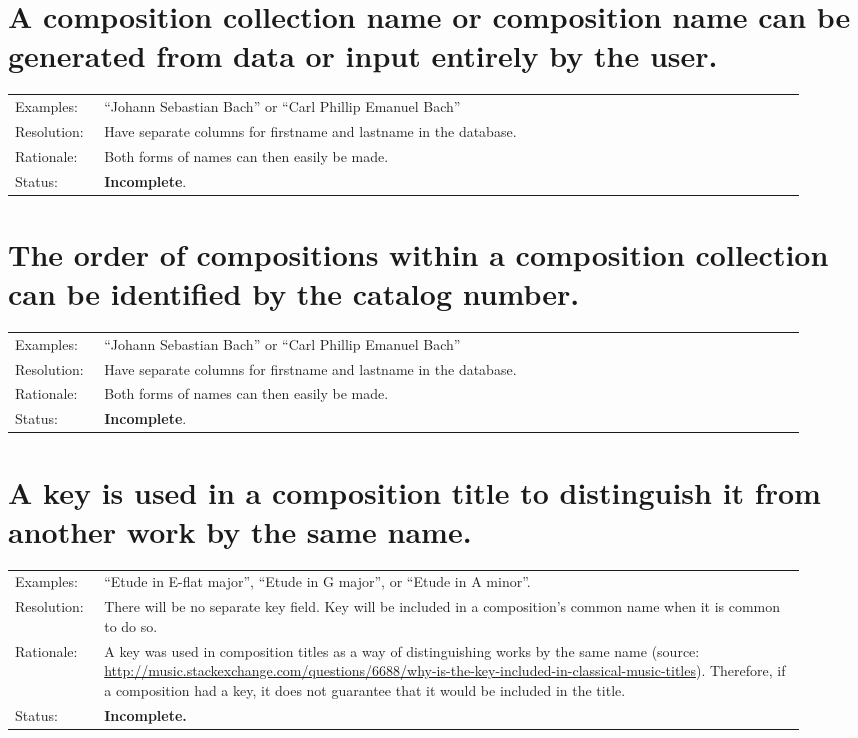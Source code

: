 \documentclass[letterpaper]{report}
\begin{document}
\section{A composition collection name or composition name can be generated from data or input entirely by the user.}
\label{D.12}

\begin{tabular}{ p{0.1\linewidth} p{0.825\linewidth} }
  Examples: & ``Johann Sebastian Bach'' or ``Carl Phillip Emanuel Bach'' \\ 
  Resolution: & Have separate columns for firstname and lastname in the database. \\
  Rationale: & Both forms of names can then easily be made. \\
  Status: & \textbf{Incomplete}.
\end{tabular}

\section{The order of compositions within a composition collection can be identified by the catalog number.}
\label{D.12}

\begin{tabular}{ p{0.1\linewidth} p{0.825\linewidth} }
  Examples: & ``Johann Sebastian Bach'' or ``Carl Phillip Emanuel Bach'' \\ 
  Resolution: & Have separate columns for firstname and lastname in the database. \\
  Rationale: & Both forms of names can then easily be made. \\
  Status: & \textbf{Incomplete}.
\end{tabular}

\section{A key is used in a composition title to distinguish it from another work by the same name.}

\begin{tabular}{ p{0.1\linewidth} p{0.825\linewidth} }
  Examples: & ``Etude in E-flat major'', ``Etude in G major'', or ``Etude in A minor''. \\ 
  Resolution: & There will be no separate key field. Key will be included in a composition's common name when it is common to do so. \\
  Rationale: & A key was used in composition titles as a way of distinguishing works by the same name (source: \url{http://music.stackexchange.com/questions/6688/why-is-the-key-included-in-classical-music-titles}). Therefore, if a composition had a key, it does not guarantee that it would be included in the title. \\
  Status: & \textbf{Incomplete.}
\end{tabular}
\end{document}
